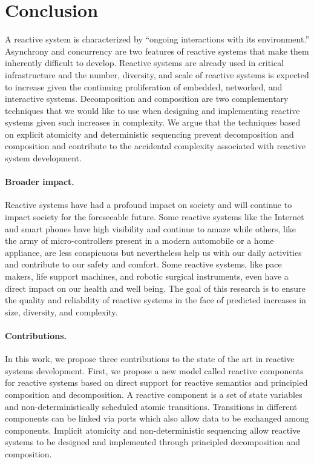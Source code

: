 \section{Conclusion}

A reactive system is characterized by ``ongoing interactions with its environment\cite{manna1992temporal}.''
Asynchrony and concurrency are two features of reactive systems that make them inherently difficult to develop.
Reactive systems are already used in critical infrastructure and the number, diversity, and scale of reactive systems is expected to increase given the continuing proliferation of embedded, networked, and interactive systems.
Decomposition and composition are two complementary techniques that we would like to use when designing and implementing reactive systems given such increases in complexity.
We argue that the techniques based on explicit atomicity and deterministic sequencing prevent decomposition and composition and contribute to the accidental complexity associated with reactive system development.

\paragraph{Broader impact.}
Reactive systems have had a profound impact on society and will continue to impact society for the foreseeable future.
Some reactive systems like the Internet and smart phones have high visibility and continue to amaze while others, like the army of micro-controllers present in a modern automobile or a home appliance, are less conspicuous but nevertheless help us with our daily activities and contribute to our safety and comfort.
Some reactive systems, like pace makers, life support machines, and robotic surgical instruments, even have a direct impact on our health and well being.
The goal of this research is to ensure the quality and reliability of reactive systems in the face of predicted increases in size, diversity, and complexity.

\paragraph{Contributions.}
In this work, we propose three contributions to the state of the art in reactive systems development.
First, we propose a new model called reactive components for reactive systems based on direct support for reactive semantics and principled composition and decomposition.
A reactive component is a set of state variables and non-deterministically scheduled atomic transitions.
Transitions in different components can be linked via ports which also allow data to be exchanged among components.
Implicit atomicity and non-deterministic sequencing allow reactive systems to be designed and implemented through principled decomposition and composition.

